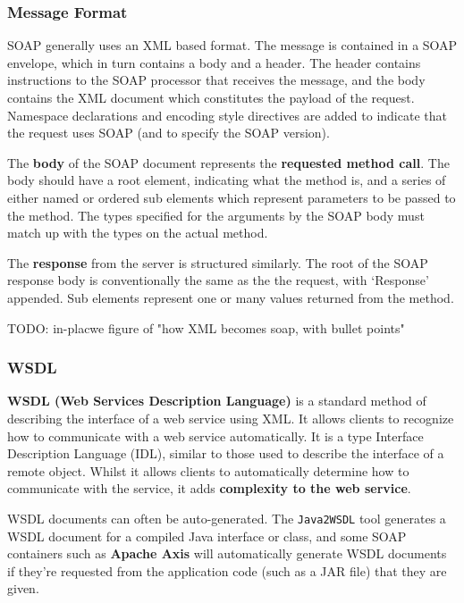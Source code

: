 \documentclass{article}
\begin{document}
\subsubsection{Message Format}

SOAP generally uses an XML based format. The message is contained in a SOAP envelope, which in turn contains a body and a header. The header contains instructions to the SOAP processor that receives the message, and the body contains the XML document which constitutes the payload of the request. Namespace declarations and encoding style directives are added to indicate that the request uses SOAP (and to specify the SOAP version). 

The \textbf{body} of the SOAP document represents the \textbf{requested method call}. The body should have a root element, indicating what the method is, and a series of either named or ordered sub elements which represent parameters to be passed to the method. The types specified for the arguments by the SOAP body must match up with the types on the actual method.

The \textbf{response} from the server is structured similarly. The root of the SOAP response body is conventionally the same as the the request, with `Response' appended. Sub elements represent one or many values returned from the method.

TODO: in-placwe figure of "how XML becomes soap, with bullet points"

\subsubsection{WSDL}

\textbf{WSDL (Web Services Description Language)} is a standard method of describing the interface of a web service using XML. It allows clients to recognize how to communicate with a web service automatically. It is a type Interface Description Language (IDL), similar to those used to describe the interface of a remote object. Whilst it allows clients to automatically determine how to communicate with the service, it adds \textbf{complexity to the web service}.

WSDL documents can often be auto-generated. The \texttt{Java2WSDL} tool generates a WSDL document for a compiled Java interface or class, and some SOAP containers such as \textbf{Apache Axis} will automatically generate WSDL documents if they're requested from the application code (such as a JAR file) that they are given. 
\end{document}
